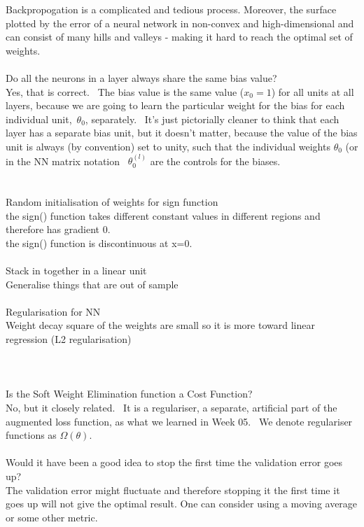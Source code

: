 \documentclass[11pt]{article}
\begin{document}
Backpropogation is a complicated and tedious process. Moreover, the surface plotted by the error of a neural network in non-convex and high-dimensional and can consist of many hills and valleys - making it hard to reach the optimal set of weights.\\
\\
Do all the neurons in a layer always share the same bias value?
\\
Yes, that is correct.  The bias value is the same value ($x_0=1$) for all units at all layers, because we are going to learn the particular weight for the bias for each individual unit, $\theta_{0}$, separately.  It's just pictorially cleaner to think that each layer has a separate bias unit, but it doesn't matter, because the value of the bias unit is always (by convention) set to unity, such that the individual weights $\theta_{0}$ (or in the NN matrix notation  $\theta^{(l)}_0$ are the controls for the biases. \\\\
\\
Random initialisation of weights for sign function\\
the sign() function takes different constant values in different regions and therefore has gradient 0.\\
the sign() function is discontinuous at x=0.\\
\\
Stack in together in a linear unit\\
Generalise things that are out of sample\\
\\
Regularisation for NN\\
Weight decay square of the weights are small so it is more toward linear regression (L2 regularisation) \\
\\
\\
\\
Is the Soft Weight Elimination function a Cost Function?\\
No, but it closely related.  It is a regulariser, a separate, artificial part of the augmented loss function, as what we learned in Week 05.  We denote regulariser functions as $\Omega(\theta)$.
\\\\
Would it have been a good idea to stop the first time the validation error goes up?\\
The validation error might fluctuate and therefore stopping it the first time it goes up will not give the optimal result. One can consider using a moving average or some other metric.\\
\end{document}
